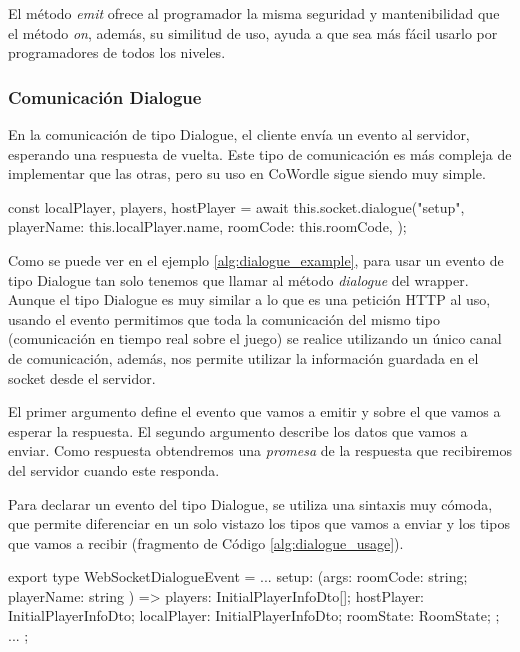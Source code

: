 El método \textit{emit} ofrece al programador la misma seguridad y mantenibilidad que el método \textit{on}, además, su similitud de uso, ayuda a que sea más fácil usarlo por programadores de todos los niveles.

\subsubsection{Comunicación Dialogue}
En la comunicación de tipo Dialogue, el cliente envía un evento al servidor, esperando una respuesta de vuelta. Este tipo de comunicación es más compleja de implementar que las otras, pero su uso en CoWordle sigue siendo muy simple.

\begin{mytypescript}[float={!t},caption={Ejemplo de uso del método \textit{dialogue}.},label={alg:dialogue_example}]
	const { localPlayer, players, hostPlayer } = await this.socket.dialogue("setup", {
		playerName: this.localPlayer.name,
		roomCode: this.roomCode,
	});
\end{mytypescript}

Como se puede ver en el ejemplo \ref{alg:dialogue_example}, para usar un evento de tipo Dialogue tan solo tenemos que llamar al método \textit{dialogue} del wrapper. Aunque el tipo Dialogue es muy similar a lo que es una petición HTTP al uso, usando el evento permitimos que toda la comunicación del mismo tipo (comunicación en tiempo real sobre el juego) se realice utilizando un único canal de comunicación, además, nos permite utilizar la información guardada en el socket desde el servidor.

El primer argumento define el evento que vamos a emitir y sobre el que vamos a esperar la respuesta. El segundo argumento describe los datos que vamos a enviar. Como respuesta obtendremos una \textit{promesa} de la respuesta que recibiremos del servidor cuando este responda.

Para declarar un evento del tipo Dialogue, se utiliza una sintaxis muy cómoda, que permite diferenciar en un solo vistazo los tipos que vamos a enviar y los tipos que vamos a recibir (fragmento de Código \ref{alg:dialogue_usage}).

\begin{mytypescript}[float={!t},caption={Ejemplo de declaración del tipo de evento Dialogue.},label={alg:dialogue_usage}]
	export type WebSocketDialogueEvent = {
		...
		setup: (args: { roomCode: string; playerName: string }) => {
			players: InitialPlayerInfoDto[];
			hostPlayer: InitialPlayerInfoDto;
			localPlayer: InitialPlayerInfoDto;
			roomState: RoomState;
		};
		...
	};
\end{mytypescript}

